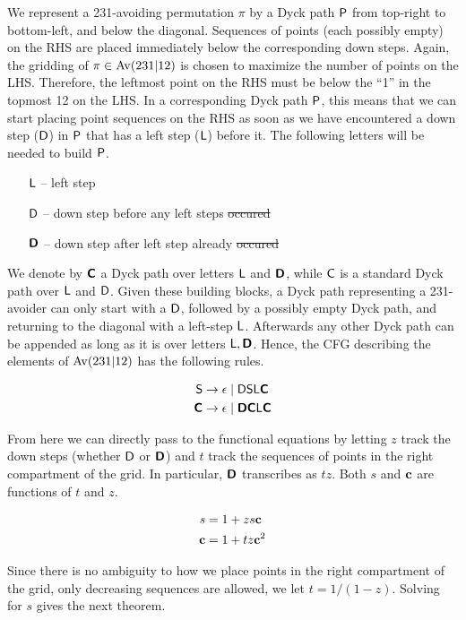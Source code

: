 \documentclass[12pt, a4paper, twoside]{report}
\providecommand{\DIFaddtex}[1]{{\protect\color{blue}\uwave{#1}}} %
\providecommand{\DIFdeltex}[1]{{\protect\color{red}\sout{#1}}}                      %
\providecommand{\DIFaddbegin}{} %
\providecommand{\DIFaddend}{} %
\providecommand{\DIFdelbegin}{} %
\providecommand{\DIFdelend}{} %
\providecommand{\DIFadd}[1]{\texorpdfstring{\DIFaddtex{#1}}{#1}} %
\providecommand{\DIFdel}[1]{\texorpdfstring{\DIFdeltex{#1}}{}} %
\begin{document}
We represent a 231-avoiding permutation $\pi$ by a Dyck path $\textsf{P}$ from top-right to bottom-left, and below the diagonal. Sequences of points (each possibly empty) on the RHS are placed immediately below the corresponding down steps. Again, the gridding of $\pi \in \mathrm{Av}(231|12)$ is chosen to maximize the number of points on the LHS. Therefore, the leftmost point on the RHS must be below the ``1'' in the topmost 12 on the LHS. In a corresponding Dyck path $\textsf{P}$, this means that we can start placing point sequences on the RHS as soon as we have encountered a down step ($\mathsf{D}$) in $\textsf{P}$ that has a left step ($\mathsf{L}$) before it. The following letters will be needed to build $\textsf{P}$. 
\begin{enumerate}
\item[$\mathsf{L}$ --] left step
\item[$\mathsf{D}$ --] down step before any left steps \DIFdelbegin \DIFdel{occured
}\DIFdelend \DIFaddbegin \DIFadd{occurred
}\DIFaddend \item[$\textbf{\textsf{D}}$ --] down step after left step already \DIFdelbegin \DIFdel{occured
}\DIFdelend \DIFaddbegin \DIFadd{occurred
}\DIFaddend \end{enumerate}

We denote by $\textbf{\textsf{C}}$ a Dyck path over letters $\mathsf{L}$ and $\textbf{\textsf{D}}$, while $\mathsf{C}$ is a standard Dyck path over $\mathsf{L}$ and $\mathsf{D}$. Given these building blocks, a Dyck path representing a 231-avoider can only start with a $\mathsf{D}$, followed by a possibly empty Dyck path, and returning to the diagonal with a left-step $\mathsf{L}$. Afterwards any other Dyck path can be appended as long as it is over letters $\mathsf{L}, \textbf{\textsf{D}}$. Hence, the CFG describing the elements of $\mathrm{Av}(231|12)$ has the following rules.

\begin{align*}
\mathsf{S} &\to \epsilon \mid \mathsf{D}\mathsf{S}\mathsf{L}\textbf{\textsf{C}}\\
\textbf{\textsf{C}} &\to \epsilon \mid \textbf{\textsf{D}}\textbf{\textsf{C}}\mathsf{L}\textbf{\textsf{C}}
\end{align*}

From here we can directly pass to the functional equations by letting $z$ track the down steps (whether $\mathsf{D}$ or $\textbf{\textsf{D}}$) and $t$ track the sequences of points in the right compartment of the grid. In particular, $\textbf{\textsf{D}}$ transcribes as $tz$. Both $s$ and $\mathbf{c}$ are functions of $t$ and $z$.

\begin{align*}
s &= 1 + zs\mathbf{c}\\
\mathbf{c} &= 1 + tz\mathbf{c}^2
\end{align*}

Since there is no ambiguity to how we place points in the right compartment of the grid, only decreasing sequences are allowed, we let $t = 1/(1-z)$. Solving for $s$ gives the next theorem. 
\end{document}

